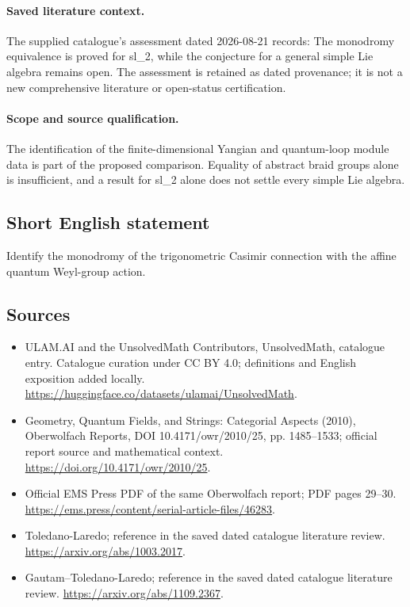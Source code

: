 \documentclass[11pt]{article}
\begin{document}
\paragraph{Saved literature context.} The supplied catalogue's assessment dated 2026-08-21 records: The monodromy equivalence is proved for sl\_2, while the conjecture for a general simple Lie algebra remains open. The assessment is retained as dated provenance; it is not a new comprehensive literature or open-status certification.
\paragraph{Scope and source qualification.}The identification of the finite-dimensional Yangian and quantum-loop module data is part of the proposed comparison. Equality of abstract braid groups alone is insufficient, and a result for sl_2 alone does not settle every simple Lie algebra.
\subsection{Short English statement}
Identify the monodromy of the trigonometric Casimir connection with the affine quantum Weyl-group action.
\subsection{Sources}
\begin{itemize}
\item[\hypertarget{source:statement:1}{S1}] ULAM.AI and the UnsolvedMath Contributors, UnsolvedMath, catalogue entry. Catalogue curation under CC BY 4.0; definitions and English exposition added locally.
\url{https://huggingface.co/datasets/ulamai/UnsolvedMath}.
\item[\hypertarget{source:statement:2}{S2}] Geometry, Quantum Fields, and Strings: Categorial Aspects (2010), Oberwolfach Reports, DOI 10.4171/owr/2010/25, pp. 1485--1533; official report source and mathematical context.
\url{https://doi.org/10.4171/owr/2010/25}.
\item[\hypertarget{source:statement:3}{S3}] Official EMS Press PDF of the same Oberwolfach report; PDF pages 29--30.
\url{https://ems.press/content/serial-article-files/46283}.
\item[\hypertarget{source:statement:4}{S4}] Toledano-Laredo; reference in the saved dated catalogue literature review.
\url{https://arxiv.org/abs/1003.2017}.
\item[\hypertarget{source:statement:5}{S5}] Gautam--Toledano-Laredo; reference in the saved dated catalogue literature review.
\url{https://arxiv.org/abs/1109.2367}.
\end{itemize}
\label{end:statement}
\end{document}
